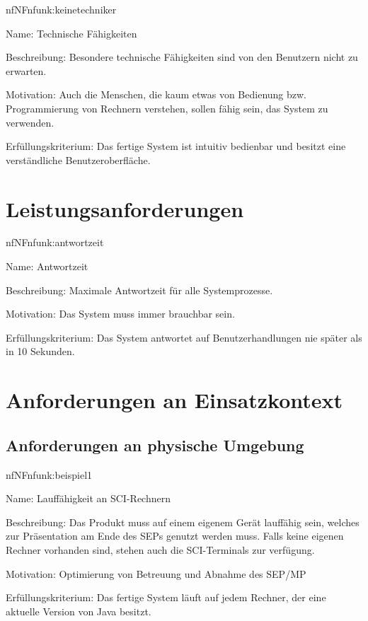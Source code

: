 \begin{description}[leftmargin=5em, style=sameline]	
	\begin{lhp}{nf}{NF}{nfunk:keinetechniker}
		\item [Name:] Technische Fähigkeiten
		\item [Beschreibung:] Besondere technische Fähigkeiten sind von den Benutzern nicht zu erwarten.
		\item [Motivation:] Auch die Menschen, die kaum etwas von Bedienung bzw. Programmierung von Rechnern verstehen, sollen fähig sein, das System zu verwenden.
		\item [Erfüllungskriterium:] Das fertige System ist intuitiv bedienbar und besitzt eine verständliche
		                             Benutzeroberfläche.
	\end{lhp}
\end{description}

\section{Leistungsanforderungen}

\begin{description}[leftmargin=5em, style=sameline]	
	\begin{lhp}{nf}{NF}{nfunk:antwortzeit}
		\item [Name:] Antwortzeit
		\item [Beschreibung:] Maximale Antwortzeit für alle Systemprozesse.
		\item [Motivation:] Das System muss immer brauchbar sein.
		\item [Erfüllungskriterium:] Das System antwortet auf Benutzerhandlungen nie später als in 10 Sekunden.
	\end{lhp}
\end{description}

\section{Anforderungen an Einsatzkontext}

\subsection{Anforderungen an physische Umgebung}

\begin{description}[leftmargin=5em, style=sameline]	
	\begin{lhp}{nf}{NF}{nfunk:beispiel1}
		\item [Name:] Lauffähigkeit an SCI-Rechnern
		\item [Beschreibung:] Das Produkt muss auf einem eigenem Gerät lauffähig sein, welches zur Präsentation am Ende des SEPs genutzt werden muss. Falls keine eigenen Rechner vorhanden sind, stehen auch die SCI-Terminals zur verfügung.
		\item [Motivation:] Optimierung von Betreuung und Abnahme des SEP/MP
		\item [Erfüllungskriterium:] Das fertige System läuft auf jedem Rechner, der eine aktuelle Version von Java besitzt.
	\end{lhp}
\end{description}


